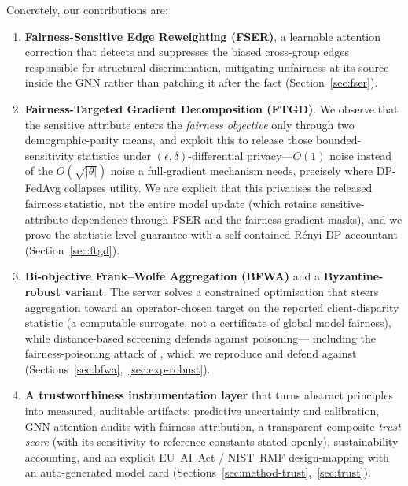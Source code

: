 \documentclass[pdflatex,sn-mathphys-num]{sn-jnl}
\theoremstyle{thmstyleone}%
\theoremstyle{thmstyletwo}%
\theoremstyle{thmstylethree}%
\begin{document}
\medskip
\noindent Concretely, our contributions are:
\begin{enumerate}
\item \textbf{Fairness-Sensitive Edge Reweighting (FSER)}, a learnable attention
correction that detects and suppresses the biased cross-group edges responsible
for structural discrimination, mitigating unfairness at its source inside the
GNN rather than patching it after the fact (Section~\ref{sec:fser}).

\item \textbf{Fairness-Targeted Gradient Decomposition (FTGD)}. We observe that
the sensitive attribute enters the \emph{fairness objective} only through two
demographic-parity means, and exploit this to release those bounded-sensitivity
statistics under $(\epsilon,\delta)$-differential privacy---$O(1)$ noise instead
of the $O(\sqrt{|\theta|})$ noise a full-gradient mechanism needs, precisely
where DP-FedAvg collapses utility. We are explicit that this privatises the
released fairness statistic, not the entire model update (which retains
sensitive-attribute dependence through FSER and the fairness-gradient masks),
and we prove the statistic-level guarantee with a self-contained R\'enyi-DP
accountant (Section~\ref{sec:ftgd}).

\item \textbf{Bi-objective Frank--Wolfe Aggregation (BFWA)} and a
\textbf{Byzantine-robust variant}. The server solves a constrained optimisation
that steers aggregation toward an operator-chosen target on the reported
client-disparity statistic (a computable surrogate, not a certificate of global
model fairness), while distance-based screening defends against poisoning---
including the fairness-poisoning attack of \cite{kasyap2025attack}, which we
reproduce and defend against (Sections~\ref{sec:bfwa},~\ref{sec:exp-robust}).

\item \textbf{A trustworthiness instrumentation layer} that turns abstract
principles into measured, auditable artifacts: predictive uncertainty and
calibration, GNN attention audits with fairness attribution, a transparent
composite \emph{trust score} (with its sensitivity to reference constants stated
openly), sustainability accounting, and an explicit EU~AI~Act / NIST~RMF
design-mapping with an auto-generated model card
(Sections~\ref{sec:method-trust},~\ref{sec:trust}).


\end{enumerate}
\end{document}
